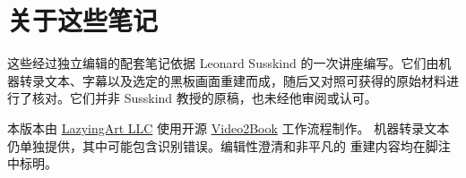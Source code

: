 \documentclass[11pt,oneside]{book}
\begin{document}
\frontmatter
\hypersetup{pageanchor=false}

\hypersetup{pageanchor=true}

\clearpage
\chapter*{关于这些笔记}
这些经过独立编辑的配套笔记依据 Leonard Susskind 的一次讲座编写。它们由机器转录文本、字幕以及选定的黑板画面重建而成，随后又对照可获得的原始材料进行了核对。它们并非 Susskind 教授的原稿，也未经他审阅或认可。

本版本由 \href{https://lazying.art}{LazyingArt LLC} 使用开源
\href{https://github.com/lachlanchen/Video2Book}{Video2Book} 工作流程制作。
机器转录文本仍单独提供，其中可能包含识别错误。编辑性澄清和非平凡的
重建内容均在脚注中标明。
\clearpage
\tableofcontents
\mainmatter
\graphicspath{{../../../generated_course_notes/supplementary/higgs_boson/2012_summer/chapters/lecture_01/}{../../../generated_course_notes/supplementary/higgs_boson/2012_summer/figures/}{../../../generated_course_notes/supplementary/higgs_boson/2012_summer/assets/}}

\end{document}
